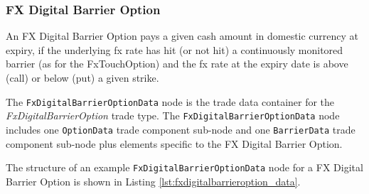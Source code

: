 \subsubsection{FX Digital Barrier Option}

\ifdefined{}

\else

An FX Digital Barrier Option pays a given cash amount in domestic currency at expiry, if the underlying fx rate has hit (or not hit) a continuously monitored barrier (as for the FxTouchOption) and the fx rate at the expiry date is above (call) or below (put) a given strike.

\fi

The \lstinline!FxDigitalBarrierOptionData!  node is the trade data container for the \emph{FxDigitalBarrierOption} trade type.   The
\lstinline!FxDigitalBarrierOptionData!  node includes one  \lstinline!OptionData! trade component sub-node and one \lstinline!BarrierData! trade component sub-node plus elements
specific to the FX Digital Barrier Option. 

The structure of an example \lstinline!FxDigitalBarrierOptionData! node for a FX Digital Barrier Option is shown in Listing
\ref{lst:fxdigitalbarrieroption_data}.

